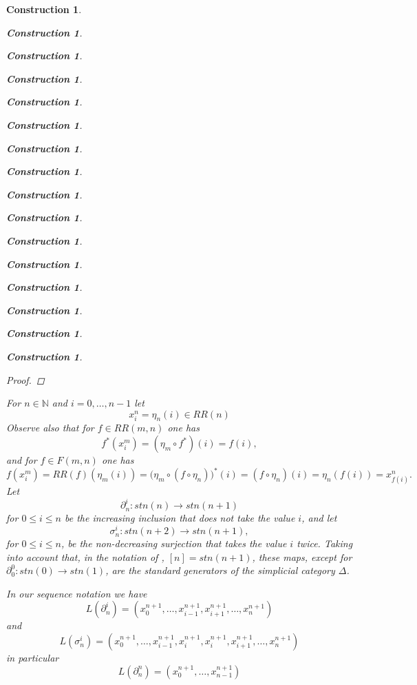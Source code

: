 \documentclass[12pt]{amsart}
\numberwithin{proposition}{subsection}
\newtheorem{construction}[proposition]{Construction}
\newcommand{\llabel}[1]{\label{#1}}
\newcommand{\sr}{\rightarrow}
\newcommand{\nn}{{\mathbb N}}
\newcommand{\nat}{\nn}
\newcommand{\mbind}[1]{{#1^*}}
\begin{document}
\begin{construction}
\begin{construction}
\begin{construction}
\begin{construction}
\begin{construction}
\begin{construction}
\begin{construction}
\begin{construction}
\begin{construction}
\begin{construction}
\begin{construction}
\begin{construction}
\begin{construction}
\begin{construction}
\begin{construction}
\begin{construction}
\begin{proof}
\end{proof}
%
For $n\in\nat$ and $i=0,\dots,n-1$ let
%
$$x_i^n=\eta_{n}(i)\in RR(n)$$
%
Observe also that for $f\in RR(m,n)$ one has
%
\begin{equation}\llabel{2015.08.24.eq5}
\mbind{f}(x_i^m)=(\eta_{m}\circ\mbind{f})(i)=f(i),
\end{equation}%
%
and for $f\in F(m,n)$ one has
%
\begin{equation}\llabel{2016.01.15.eq1}
f(x_i^m)=RR(f)(\eta_{m}(i))=(\eta_{m}\circ \mbind{(f\circ \eta_{n}))}(i)=(f\circ \eta_{n})(i)=\eta_{n}(f(i))=x_{f(i)}^n.
\end{equation}%
%
Let 
%
$$\partial^{i}_{n}:stn(n)\sr stn(n+1)$$
%
for $0\le i\le n$ be the increasing inclusion that does not take the value $i$, and let
%
$$\sigma^{i}_{n}:stn(n+2)\sr stn(n+1),$$
%
for $0\le i\le n$, be the non-decreasing surjection that takes the value $i$
twice. Taking into account that, in the notation of \cite{GabZis},
$[n]=stn(n+1)$, these maps, except for $\partial^0_0:stn(0)\sr stn(1)$, are the standard generators of the simplicial category
$\Delta$.

In our sequence notation we have
%
\begin{equation}\llabel{2015.08.24.eq7}
L(\partial^{i}_{n})=(x_0^{n+1},\dots,x_{i-1}^{n+1},x_{i+1}^{n+1},\dots,x_n^{n+1})
\end{equation}%
%
and
%
\begin{equation}\llabel{2015.08.24.eq8}
L(\sigma^{i}_{n})=(x_0^{n+1},\dots,x_{i-1}^{n+1},x_i^{n+1},x_i^{n+1},x_{i+1}^{n+1},\dots,x_n^{n+1})
\end{equation}%
%
in particular
%
\begin{equation}\llabel{2015.07.12.eq5}
L(\partial^{n}_n)=(x_0^{n+1},\dots,x_{n-1}^{n+1})
\end{equation}%
%


\end{construction}
\end{construction}
\end{construction}
\end{construction}
\end{construction}
\end{construction}
\end{construction}
\end{construction}
\end{construction}
\end{construction}
\end{construction}
\end{construction}
\end{construction}
\end{construction}
\end{construction}
\end{construction}
\end{document}
